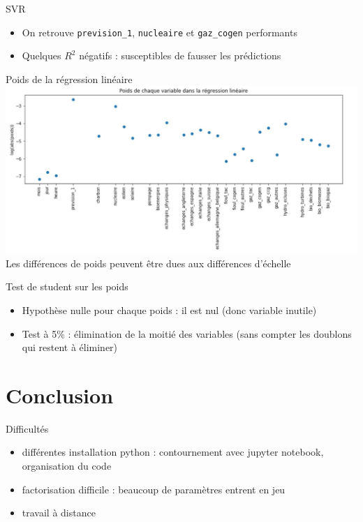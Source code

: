 \begin{frame}[fragile]{SVR}
\protect\hypertarget{svr}{}
\begin{itemize}
\tightlist
\item
  On retrouve \texttt{prevision\_1}, \texttt{nucleaire} et
  \texttt{gaz\_cogen} performants
\item
  Quelques \(R^2\) négatifs : susceptibles de fausser les prédictions
\end{itemize}
\end{frame}

\begin{frame}{Poids de la régression linéaire}
\protect\hypertarget{poids-de-la-ruxe9gression-linuxe9aire}{}
\includegraphics[scale=.5]{figures/poids.JPG} Les différences de poids
peuvent être dues aux différences d'échelle
\end{frame}

\begin{frame}{Test de student sur les poids}
\protect\hypertarget{test-de-student-sur-les-poids}{}
\begin{itemize}
\tightlist
\item
  Hypothèse nulle pour chaque poids : il est nul (donc variable inutile)
\item
  Test à 5\% : élimination de la moitié des variables (sans compter les
  doublons qui restent à éliminer)
\end{itemize}
\end{frame}

\hypertarget{conclusion}{%
\section{Conclusion}\label{conclusion}}

\begin{frame}{Difficultés}
\protect\hypertarget{difficultuxe9s}{}
\begin{itemize}
\tightlist
\item
  différentes installation python : contournement avec jupyter notebook,
  organisation du code
\item
  factorisation difficile : beaucoup de paramètres entrent en jeu
\item
  travail à distance
\end{itemize}
\end{frame}

